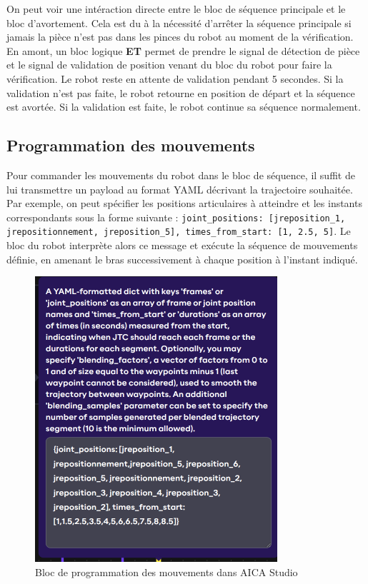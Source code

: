 On peut voir une intéraction directe entre le bloc de séquence principale et le bloc d'avortement. Cela est du à la nécessité d'arrêter la séquence principale si jamais la pièce n'est pas dans les pinces du robot au moment de la vérification. En amont, un bloc logique \textbf{ET} permet de prendre le signal de détection de pièce et le signal de validation de position venant du bloc du robot pour faire la vérification. Le robot reste en attente de validation pendant 5 secondes. Si la validation n'est pas faite, le robot retourne en position de départ et la séquence est avortée. Si la validation est faite, le robot continue sa séquence normalement.

\subsection{Programmation des mouvements}

Pour commander les mouvements du robot dans le bloc de séquence, il suffit de lui transmettre un \gls{payload} au format YAML décrivant la trajectoire souhaitée. Par exemple, on peut spécifier les positions articulaires à atteindre et les instants correspondants sous la forme suivante :
\texttt{{joint\_positions: [jreposition\_1, jrepositionnement, jreposition\_5], times\_from\_start: [1, 2.5, 5]}}.
Le bloc du robot interprète alors ce message et exécute la séquence de mouvements définie, en amenant le bras successivement à chaque position à l’instant indiqué.

\begin{figure}[H]
    \centering
    \includegraphics[width=0.8\textwidth]{assets/figures/AICA_payload.png}
    \caption{Bloc de programmation des mouvements dans AICA Studio}
    \label{fig:payload_block}
\end{figure}

